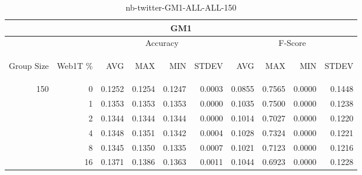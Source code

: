 \begin{center}
\begin{table}[htbp]
\begin{center}
\begin{tabular}{ | r | r | r | r | r | r | r | r | r | r |}
\hline
\multicolumn{10}{|c|}{GM1}\\
\hline
 & & \multicolumn{4}{|c|}{Accuracy} & \multicolumn{4}{|c|}{F-Score}\\ \cline{3-10}
\begin{sideways}Group Size\end{sideways} & \begin{sideways}Web1T \%\end{sideways} & \begin{sideways}AVG\end{sideways} & \begin{sideways}MAX\end{sideways} & \begin{sideways}MIN\end{sideways} & \begin{sideways}STDEV\end{sideways} & \begin{sideways}AVG\end{sideways} & \begin{sideways}MAX\end{sideways} & \begin{sideways}MIN\end{sideways} & \begin{sideways}STDEV\end{sideways}\\
\hline
\multirow{5}{*}{150}
 & 0 & 0.1252 & 0.1254 & 0.1247 & 0.0003 & 0.0855 & 0.7565 & 0.0000 & 0.1448\\ \cline{2-10}
 & 1 & 0.1353 & 0.1353 & 0.1353 & 0.0000 & 0.1035 & 0.7500 & 0.0000 & 0.1238\\ \cline{2-10}
 & 2 & 0.1344 & 0.1344 & 0.1344 & 0.0000 & 0.1014 & 0.7027 & 0.0000 & 0.1220\\ \cline{2-10}
 & 4 & 0.1348 & 0.1351 & 0.1342 & 0.0004 & 0.1028 & 0.7324 & 0.0000 & 0.1221\\ \cline{2-10}
 & 8 & 0.1345 & 0.1350 & 0.1335 & 0.0007 & 0.1021 & 0.7123 & 0.0000 & 0.1216\\ \cline{2-10}
 & 16 & 0.1371 & 0.1386 & 0.1363 & 0.0011 & 0.1044 & 0.6923 & 0.0000 & 0.1228\\ \cline{2-10}
\hline
\end{tabular}
\caption{nb-twitter-GM1-ALL-ALL-150}
\label{table:nb-twitter-GM1-ALL-ALL-150}
\end{center}
\end{table}
\end{center}

